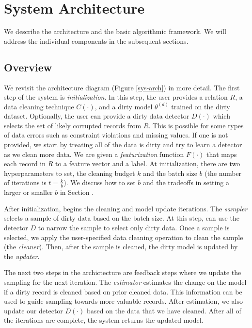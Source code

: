 \section{System Architecture}\label{arch}
We describe the \sys architecture and the basic algorithmic framework.
We will address the individual components in the subsequent sections.

\subsection{Overview}
We revisit the architecture diagram (Figure \ref{sys-arch}) in more detail.
The first step of the system is \emph{initialization}.
In this step, the user provides a relation $R$, a data cleaning technique $C(\cdot)$, and a dirty model $\theta^{(d)}$ trained on the dirty dataset. 
Optionally, the user can provide a dirty data detector $D(\cdot)$ which selects the set of likely corrupted records from $R$.
This is possible for some types of data errors such as constraint violations and missing values.
If one is not provided, we start by treating all of the data is dirty and try to learn a detector as we clean more data.
We are given a \emph{featurization} function $F(\cdot)$ that maps each record in $R$ to a feature vector and a label.
At initialization, there are two hyperparameters to set, the cleaning budget $k$ and the batch size $b$ (the number of iterations is $t = \frac{k}{b}$).
We discuss how to set $b$ and the tradeoffs in setting a larger or smaller $b$ in Section \label{model-update}.

After initialization, \sys begins the cleaning and model update iterations.
The \emph{sampler} selects a sample of dirty data based on the batch size.
At this step, \sys can use the detector $D$ to narrow the sample to select only dirty data.
Once a sample is selected, we apply the user-specified data cleaning operation to clean the sample (the \emph{cleaner}).
Then, after the sample is cleaned, the dirty model is updated by the \emph{updater}.

The next two steps in the archictecture are feedback steps where we update the sampling for the next iteration.
The \emph{estimator} estimates the change on the model if a dirty record is cleaned based on prior cleaned data.
This information can be used to guide sampling towards more valuable records.
After estimation, we also update our detector $D(\cdot)$ based on the data that we have cleaned.
After all of the iterations are complete, the system returns the updated model.

